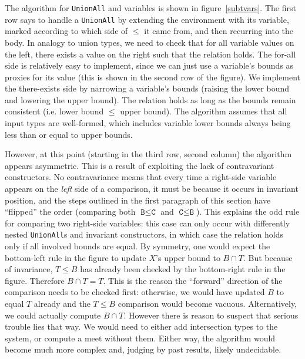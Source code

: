 The algorithm for \texttt{UnionAll} and variables is shown in figure~\ref{subtvars}.
The first row says to handle a \texttt{UnionAll} by extending the environment
with its variable, marked according to which side of $\leq$ it came from,
and then recurring into the body.
In analogy to union types, we need to check that for all variable values on
the left, there exists a value on the right such that the relation holds.
The for-all side is relatively easy to implement, since we can just use
a variable's bounds as proxies for its value (this is shown in
the second row of the figure).
We implement the there-exists side by narrowing a variable's bounds
(raising the lower bound and lowering the upper bound). The relation holds
as long as the bounds remain consistent (i.e. lower bound $\leq$
upper bound). The algorithm assumes that all input types are well-formed,
which includes variable lower bounds always being less than or equal to
upper bounds.

However, at this point (starting in the third row, second column) the
algorithm appears asymmetric. This is a result of exploiting the lack of
contravariant constructors. No contravariance means that every time a
right-side variable appears on the \emph{left} side of a comparison,
it must be because it occurs in invariant position, and the steps outlined
in the first paragraph of this section have ``flipped'' the order
(comparing both $\texttt{B}\leq\texttt{C}$ and $\texttt{C}\leq\texttt{B}$).
This explains the odd rule for comparing two right-side variables:
this case can only occur with differently nested \texttt{UnionAll}s and
invariant constructors, in which case the relation holds only if
all involved bounds are equal.
By symmetry, one would expect the bottom-left rule in the figure to
update $X$'s upper bound to $B\cap T$. But because of invariance,
$T\leq B$ has already been checked by the bottom-right rule in the
figure. Therefore $B\cap T = T$. This is the reason the ``forward''
direction of the comparison needs to be checked first: otherwise,
we would have updated $B$ to equal $T$ already and the $T\leq B$
comparison would become vacuous. Alternatively, we could actually
compute $B\cap T$. However there is reason to suspect that serious
trouble lies that way. We would need to either add intersection types
to the system, or compute a meet without them. Either way, the
algorithm would become much more complex and, judging by past
results, likely undecidable.


